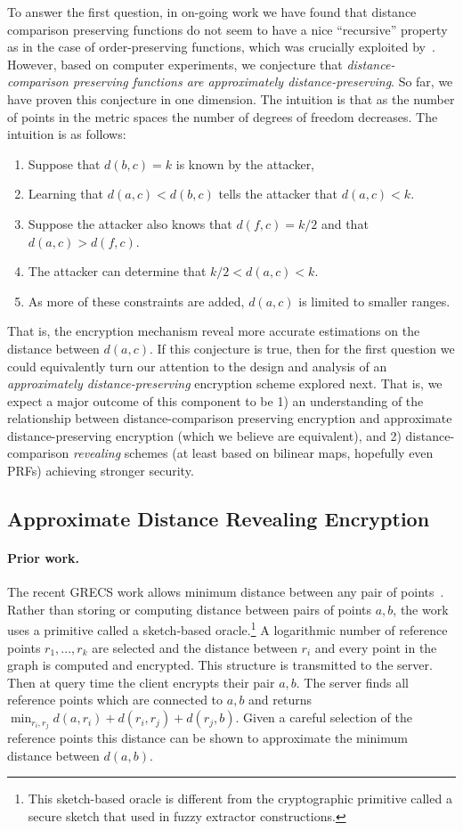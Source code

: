To answer the first question, in on-going work we have found that distance comparison preserving functions do not seem to have a nice ``recursive'' property as in the case of order-preserving functions, which was crucially exploited by~\cite{EC:BCLO09}.  However, based on computer experiments, we conjecture that \emph{distance-comparison preserving functions are approximately distance-preserving}.    So far, we have proven this conjecture in one dimension.  The intuition is that as the number of points in the metric spaces the number of degrees of freedom decreases.  The intuition is as follows:
\begin{enumerate}\setlength\itemsep{0em}
\item Suppose that $d(b,c) = k$ is known by the attacker, 
\item Learning that $d(a,c) < d(b,c)$ tells the attacker that $d(a,c)<k$.  
\item Suppose the attacker also knows that $d(f, c) = k/2$ and that $d(a,c) > d(f,c)$.  
\item The attacker can determine that $k/2< d(a,c) <k$.  
\item As more of these constraints are added, $d(a,c)$ is limited to smaller ranges.
\end{enumerate}
That is, the encryption mechanism reveal more accurate estimations on  the distance between $d(a,c)$.
If this conjecture is true, then for the first question we could equivalently turn our attention to the design and analysis of  an \emph{approximately distance-preserving} encryption scheme explored next.  That is, we expect a major outcome of this component to be 1) an understanding of the relationship between distance-comparison preserving encryption and approximate distance-preserving encryption (which we believe are equivalent), and 2) distance-comparison \emph{revealing} schemes (at least based on bilinear maps, hopefully even PRFs) achieving stronger security.

\subsection{Approximate Distance Revealing Encryption}
\paragraph{Prior work.}
The recent GRECS work allows minimum distance between any pair of points~\cite{CCS:MKNK15}.  Rather than storing or computing distance between pairs of points $a,b$, the work uses a primitive called a sketch-based oracle.\footnote{This sketch-based oracle is different from the cryptographic primitive called a secure sketch that used in fuzzy extractor constructions.}  A logarithmic number of reference points $r_1,..., r_k$ are selected and the distance between $r_i$ and every point in the graph is computed and encrypted.  This structure is transmitted to the server.  Then at query time the client encrypts their pair $a,b$.  The server finds all reference points which are connected to $a,b$ and returns $\min_{r_i, r_j} d(a,r_i) + d(r_i, r_j) + d(r_j, b)$.  Given a careful selection of the reference points this distance can be shown to approximate the minimum distance between $d(a,b)$.

